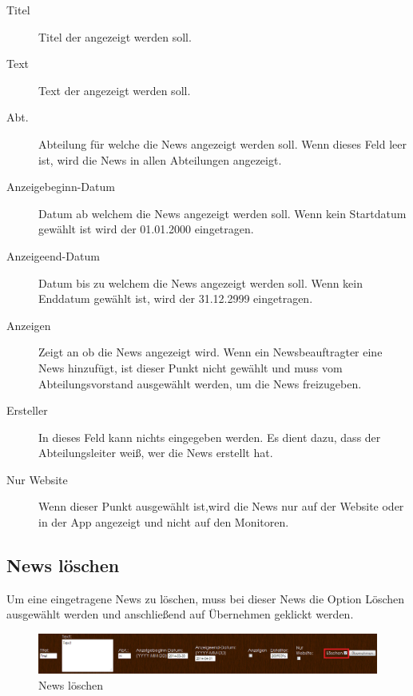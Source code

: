 \begin{description} 
\item[Titel] Titel der angezeigt werden soll.
\item[Text] Text der angezeigt werden soll.
\item[Abt.] Abteilung für welche die News angezeigt werden soll. Wenn dieses Feld leer ist, wird die News in allen Abteilungen angezeigt.
\item[Anzeigebeginn-Datum] Datum ab welchem die News angezeigt werden soll. Wenn kein Startdatum gewählt ist wird der 01.01.2000 eingetragen.
\item[Anzeigeend-Datum] Datum bis zu welchem die News angezeigt werden soll. Wenn kein Enddatum gewählt ist, wird der 31.12.2999 eingetragen. 
\item[Anzeigen] Zeigt an ob die News angezeigt wird. Wenn ein Newsbeauftragter eine News hinzufügt, ist dieser Punkt nicht gewählt und muss vom Abteilungsvorstand ausgewählt werden, um die News freizugeben. 
\item[Ersteller] In dieses Feld kann nichts eingegeben werden. Es dient dazu, dass der Abteilungsleiter weiß, wer die News erstellt hat.
\item[Nur Website] Wenn dieser Punkt ausgewählt ist,wird die News nur auf der Website oder in der App angezeigt und nicht auf den Monitoren.
\end{description}

\subsection{News löschen}

Um eine eingetragene News zu löschen, muss bei dieser News die Option Löschen ausgewählt werden und anschließend auf Übernehmen geklickt werden. 

\begin{figure}[H]
\centering
\includegraphics[keepaspectratio=true, width=16cm]{images/screenshots/news_delete.png}
\caption{News löschen}
\label{fig:instr_admin_news_delete}
\end{figure}